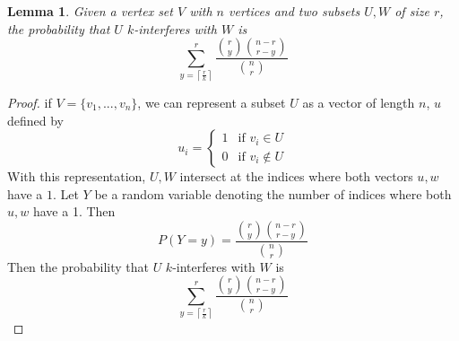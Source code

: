 \documentclass[10pt]{extarticle}
\newtheorem{lemma}[theorem]{Lemma}
\theoremstyle{definition}
\begin{document}
\begin{lemma}
    Given a vertex set $V$ with $n$ vertices and two subsets $U,W$ of size $r$, the probability that $U$ $k$-interferes with $W$ is 
    \begin{equation*}
        \sum_{y = \left\lceil \frac{r}{k} \right\rceil}^{r}  \frac{\binom{r}{y} \binom{n-r}{r-y}}{\binom{n}{r}}
    \end{equation*}
\end{lemma}
\begin{proof}
    if $V = \{v_1,...,v_n\}$, we can represent a subset $U$ as a vector of length $n$, $u$ defined by
    $$
    u_i = \begin{cases}
        1 & \text{if } v_i \in U \\
        0 & \text{if } v_i \notin U
    \end{cases}
    $$
    With this representation, $U,W$ intersect at the indices where both vectors $u, w$ have a $1$. Let $Y$ be a random variable denoting the number of indices where both $u, w$ have a 1. Then 
    \begin{equation}
        P(Y=y) = \frac{\binom{r}{y} \binom{n-r}{r-y}}{\binom{n}{r}}
    \end{equation}
    Then the probability that $U$ $k$-interferes with $W$ is 
    \begin{equation}
        \sum_{y = \left\lceil \frac{r}{k} \right\rceil}^{r}  \frac{\binom{r}{y} \binom{n-r}{r-y}}{\binom{n}{r}}
    \end{equation}
\end{proof}
\end{document}
